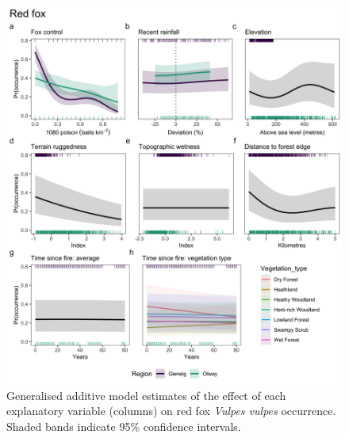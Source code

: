 \documentclass[11pt,a4paper,titlepage,twoside,openright]{style/unimelbthesis}
\begin{document}
\begin{mainmatter}
\begin{figure}
{\centering \includegraphics[width=1\linewidth]{figure/gams_fox} 

}

\caption{Generalised additive model estimates of the effect of each explanatory variable (columns) on red fox \textit{Vulpes vulpes} occurrence. Shaded bands indicate 95\% confidence intervals.}\label{fig:gams-occ-fox}
\end{figure}
\newpage
\begin{figure}


\end{figure}
\end{mainmatter}
\end{document}

